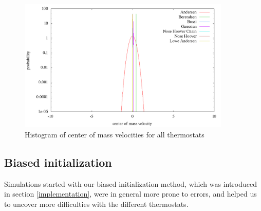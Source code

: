 \begin{figure}[H]
\centering
\includegraphics[width=0.9\textwidth]{./graphics/Histogramm_schwerVel_rand_T=20_p=64.png}
\caption{Histogram of center of mass velocities for all thermostats}
\label{im:schwerVel_rand}
\end{figure} 


\subsection{Biased initialization}
Simulations started with our biased initialization method, which was introduced in section \ref{implementation}, were in general more prone to errors, and helped us to uncover more difficulties with the different thermostats. 


